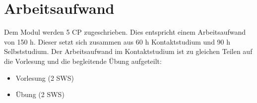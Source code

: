 \section{Arbeitsaufwand}
Dem Modul werden 5 CP zugeschrieben. Dies entspricht einem Arbeitsaufwand von 150 h. Dieser setzt sich zusammen aus 60 h Kontaktstudium und 90 h Selbststudium. Der Arbeitsaufwand im Kontaktstudium ist zu gleichen Teilen auf die Vorlesung und die begleitende Übung aufgeteilt:
\begin{itemize}
\item Vorlesung (2 SWS)
\item Übung (2 SWS)
\end{itemize}
